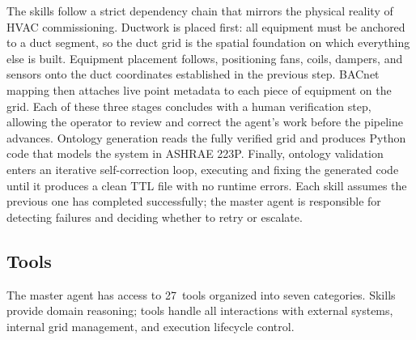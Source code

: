 The skills follow a strict dependency chain that mirrors the physical reality of HVAC
commissioning. Ductwork is placed first: all equipment must be anchored to a duct segment,
so the duct grid is the spatial foundation on which everything else is built. Equipment
placement follows, positioning fans, coils, dampers, and sensors onto the duct coordinates
established in the previous step. BACnet mapping then attaches live point metadata to each
piece of equipment on the grid. Each of these three stages concludes with a human
verification step, allowing the operator to review and correct the agent's work before the
pipeline advances. Ontology generation reads the fully verified grid and produces Python
code that models the system in ASHRAE 223P. Finally, ontology validation enters an
iterative self-correction loop, executing and fixing the generated code until it produces a
clean TTL file with no runtime errors. Each skill assumes the previous one has completed
successfully; the master agent is responsible for detecting failures and deciding whether
to retry or escalate.

\subsection{Tools}

The master agent has access to 27~tools organized into seven categories.
Skills provide domain reasoning; tools handle all interactions with external systems,
internal grid management, and execution lifecycle control.

